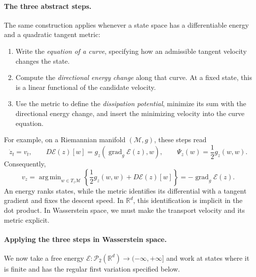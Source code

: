 \documentclass[11pt]{amsart}
\numberwithin{equation}{section}
\theoremstyle{plain}
\newcommand{\R}{\mathbb{R}}
\newcommand{\cP}{\mathcal{P}}
\DeclareMathOperator*{\argmin}{arg\,min}
\begin{document}
\paragraph{\textbf{The three abstract steps.}}
The same construction applies whenever a state space has a differentiable
energy and a quadratic tangent metric:
\begin{enumerate}[label=\arabic*.]
 \item Write the \emph{equation of a curve}, specifying how an admissible
 tangent velocity changes the state.
 \item Compute the \emph{directional energy change} along that curve.  At
 a fixed state, this is a linear functional of the candidate velocity.
 \item Use the metric to define the \emph{dissipation potential}, minimize
 its sum with the directional energy change, and insert the minimizing
 velocity into the curve equation.
\end{enumerate}
For example, on a Riemannian manifold $(\mathcal M,g)$, these steps read
\[
 \dot z_t=v_t,\qquad
 D\mathcal E(z)[w]=g_z(\operatorname{grad}_g\mathcal E(z),w),\qquad
 \Psi_z(w)=\frac12g_z(w,w).
\]
Consequently,
\[
 v_z=\argmin_{w\in T_z\mathcal M}
      \left\{\frac12g_z(w,w)+D\mathcal E(z)[w]\right\}
     =-\operatorname{grad}_g\mathcal E(z).
\]
An energy ranks states, while the metric identifies its differential with a
tangent gradient and fixes the descent speed.  In $\R^d$, this identification
is implicit in the dot product.  In Wasserstein space, we must make the
transport velocity and its metric explicit.

\paragraph{\textbf{Applying the three steps in Wasserstein space.}}
We now take a free energy
$\mathcal E:\cP_2(\R^d)\to(-\infty,+\infty]$ and work at states where it is
finite and has the regular first variation specified below.
\end{document}
